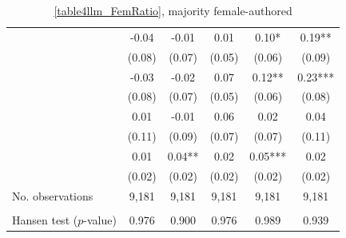 \begin{table}
    \footnotesize
    \centering
    \begin{threeparttable}
        \caption{\autoref{table4llm_FemRatio}, majority female-authored}
        \label{table4llm_Fem50}
        \begin{tabular}{p{3cm}S@{}S@{}S@{}S@{}S@{}}
            \toprule
            &{}&{}&{}&{}&{}\\
            \midrule
            &       -0.04   &       -0.01   &        0.01   &        0.10*  &        0.19** \\
                                          &      (0.08)   &      (0.07)   &      (0.05)   &      (0.06)   &      (0.09)   \\
            &       -0.03   &       -0.02   &        0.07   &        0.12** &        0.23***\\
                                          &      (0.08)   &      (0.07)   &      (0.05)   &      (0.06)   &      (0.08)   \\
            &        0.01   &       -0.01   &        0.06   &        0.02   &        0.04   \\
                                          &      (0.11)   &      (0.09)   &      (0.07)   &      (0.07)   &      (0.11)   \\
            &        0.01   &        0.04** &        0.02   &        0.05***&        0.02   \\
                                          &      (0.02)   &      (0.02)   &      (0.02)   &      (0.02)   &      (0.02)   \\
            \midrule
            No. observations      &       9,181   &       9,181   &       9,181   &       9,181   &       9,181   \\
             \\\quad Hansen test (\(p\)-value)&       0.976   &       0.900   &       0.976   &       0.989   &       0.939   \\

\end{tabular}
\end{threeparttable}
\end{table}

